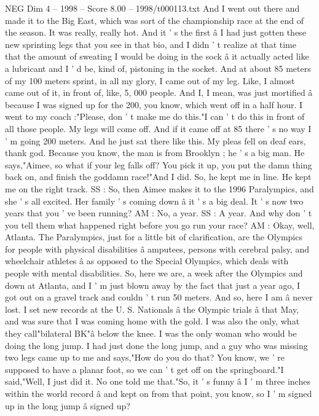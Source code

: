 \begin{textsample}{NEG Dim 4 – 1998 – Score 8.00 – 1998/t000113.txt}
And I went out there and made it to the Big East, which was sort of the championship race at the end of the season.
It was really, really hot.
And it ' s the first â I had just gotten these new sprinting legs that you see in that bio, and I didn ' t realize at that time that the amount of sweating I would be doing in the sock â it actually acted like a lubricant and I ' d be, kind of, pistoning in the socket.
And at about 85 meters of my 100 meters sprint, in all my glory, I came out of my leg.
Like, I almost came out of it, in front of, like, 5, 000 people.
And I, I mean, was just mortified â because I was signed up for the 200, you know, which went off in a half hour.
I went to my coach :"Please, don ' t make me do this."I can ' t do this in front of all those people.
My legs will come off.
And if it came off at 85 there ' s no way I ' m going 200 meters.
And he just sat there like this.
My pleas fell on deaf ears, thank god.
Because you know, the man is from Brooklyn ; he ' s a big man.
He says,"Aimee, so what if your leg falls off?
You pick it up, you put the damn thing back on, and finish the goddamn race!"And I did.
So, he kept me in line.
He kept me on the right track.
SS : So, then Aimee makes it to the 1996 Paralympics, and she ' s all excited.
Her family ' s coming down â it ' s a big deal.
It ' s now two years that you ' ve been running?
AM : No, a year.
SS : A year.
And why don ' t you tell them what happened right before you go run your race?
AM : Okay, well, Atlanta.
The Paralympics, just for a little bit of clarification, are the Olympics for people with physical disabilities â amputees, persons with cerebral palsy, and wheelchair athletes â as opposed to the Special Olympics, which deals with people with mental disabilities.
So, here we are, a week after the Olympics and down at Atlanta, and I ' m just blown away by the fact that just a year ago, I got out on a gravel track and couldn ' t run 50 meters.
And so, here I am â never lost.
I set new records at the U.
S.
Nationals â the Olympic trials â that May, and was sure that I was coming home with the gold.
I was also the only, what they call"bilateral BK"â below the knee.
I was the only woman who would be doing the long jump.
I had just done the long jump, and a guy who was missing two legs came up to me and says,"How do you do that?
You know, we ' re supposed to have a planar foot, so we can ' t get off on the springboard."I said,"Well, I just did it.
No one told me that."So, it ' s funny â I ' m three inches within the world record â and kept on from that point, you know, so I ' m signed up in the long jump â signed up?

\end{textsample}
